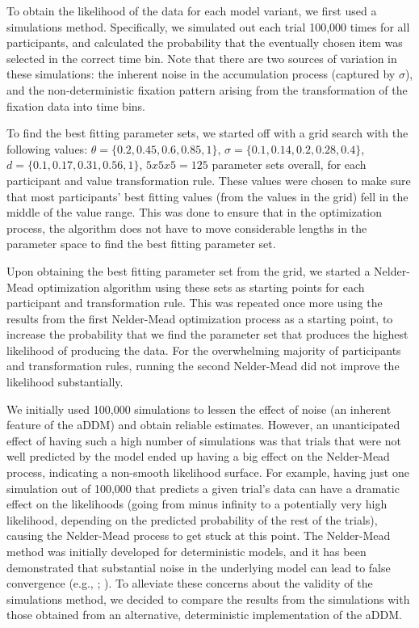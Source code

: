 \documentclass[11pt,a4paper]{article}
\begin{document}
To obtain the likelihood of the data for each model variant, we first used a simulations method. Specifically, we simulated out each trial 100,000 times for all participants, and calculated the probability that the eventually chosen item was selected in the correct time bin. Note that there are two sources of variation in these simulations: the inherent noise in the accumulation process (captured by $\sigma$), and the non-deterministic fixation pattern arising from the transformation of the fixation data into time bins.

To find the best fitting parameter sets, we started off with a grid search with the following values: $\theta=\{0.2, 0.45, 0.6, 0.85, 1\}$, $\sigma=\{0.1, 0.14, 0.2, 0.28, 0.4\}$, $\textit{d}=\{0.1, 0.17, 0.31, 0.56, 1\}$, $5x5x5 = 125$ parameter sets overall, for each participant and value transformation rule. These values were chosen to make sure that most participants' best fitting values (from the values in the grid) fell in the middle of the value range. This was done to ensure that in the optimization process, the algorithm does not have to move considerable lengths in the parameter space to find the best fitting parameter set.

Upon obtaining the best fitting parameter set from the grid, we started a Nelder-Mead optimization algorithm using these sets as starting points for each participant and transformation rule. This was repeated once more using the results from the first Nelder-Mead optimization process as a starting point, to increase the probability that we find the parameter set that produces the highest likelihood of producing the data. For the overwhelming majority of participants and transformation rules, running the second Nelder-Mead did not improve the likelihood substantially.

We initially used 100,000 simulations to lessen the effect of noise (an inherent feature of the aDDM) and obtain reliable estimates. However, an unanticipated effect of having such a high number of simulations was that trials that were not well predicted by the model ended up having a big effect on the Nelder-Mead process, indicating a non-smooth likelihood surface. For example, having just one simulation out of 100,000 that predicts a given trial's data can have a dramatic effect on the likelihoods (going from minus infinity to a potentially very high likelihood, depending on the predicted probability of the rest of the trials), causing the Nelder-Mead process to get stuck at this point. The Nelder-Mead method was initially developed for deterministic models, and it has been demonstrated that substantial noise in the underlying model can lead to false convergence (e.g., ; ). To alleviate these concerns about the validity of the simulations method, we decided to compare the results from the simulations with those obtained from an alternative, deterministic implementation of the aDDM.
\end{document}
